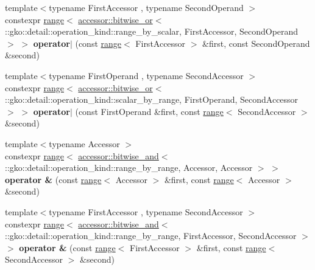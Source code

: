 \begin{DoxyCompactItemize}
\item 
\mbox{\label{namespacegko_aa8261b7cf1c5356d8acd690cf6da78ae}} 
{\footnotesize template$<$typename First\+Accessor , typename Second\+Operand $>$ }\\constexpr \hyperlink{classgko_1_1range}{range}$<$ \hyperlink{structgko_1_1accessor_1_1bitwise__or}{accessor\+::bitwise\+\_\+or}$<$ \+::gko\+::detail\+::operation\+\_\+kind\+::range\+\_\+by\+\_\+scalar, First\+Accessor, Second\+Operand $>$ $>$ {\bfseries operator$\vert$} (const \hyperlink{classgko_1_1range}{range}$<$ First\+Accessor $>$ \&first, const Second\+Operand \&second)
\item 
\mbox{\label{namespacegko_af5919cbe46045874ae714655dadf21f7}} 
{\footnotesize template$<$typename First\+Operand , typename Second\+Accessor $>$ }\\constexpr \hyperlink{classgko_1_1range}{range}$<$ \hyperlink{structgko_1_1accessor_1_1bitwise__or}{accessor\+::bitwise\+\_\+or}$<$ \+::gko\+::detail\+::operation\+\_\+kind\+::scalar\+\_\+by\+\_\+range, First\+Operand, Second\+Accessor $>$ $>$ {\bfseries operator$\vert$} (const First\+Operand \&first, const \hyperlink{classgko_1_1range}{range}$<$ Second\+Accessor $>$ \&second)
\item 
\mbox{\label{namespacegko_abae02a983895d3fc06e9d19c440200a5}} 
{\footnotesize template$<$typename Accessor $>$ }\\constexpr \hyperlink{classgko_1_1range}{range}$<$ \hyperlink{structgko_1_1accessor_1_1bitwise__and}{accessor\+::bitwise\+\_\+and}$<$ \+::gko\+::detail\+::operation\+\_\+kind\+::range\+\_\+by\+\_\+range, Accessor, Accessor $>$ $>$ {\bfseries operator \&} (const \hyperlink{classgko_1_1range}{range}$<$ Accessor $>$ \&first, const \hyperlink{classgko_1_1range}{range}$<$ Accessor $>$ \&second)
\item 
\mbox{\label{namespacegko_af48bc7970fe040fbb3f59bffa7f38b6a}} 
{\footnotesize template$<$typename First\+Accessor , typename Second\+Accessor $>$ }\\constexpr \hyperlink{classgko_1_1range}{range}$<$ \hyperlink{structgko_1_1accessor_1_1bitwise__and}{accessor\+::bitwise\+\_\+and}$<$ \+::gko\+::detail\+::operation\+\_\+kind\+::range\+\_\+by\+\_\+range, First\+Accessor, Second\+Accessor $>$ $>$ {\bfseries operator \&} (const \hyperlink{classgko_1_1range}{range}$<$ First\+Accessor $>$ \&first, const \hyperlink{classgko_1_1range}{range}$<$ Second\+Accessor $>$ \&second)

\end{DoxyCompactItemize}
